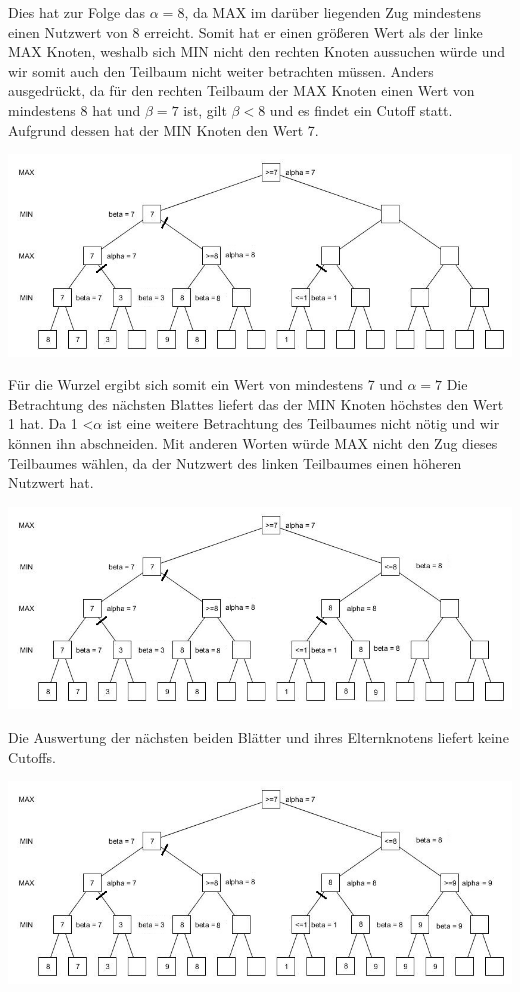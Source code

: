  Dies hat zur Folge das $\alpha =8$, da MAX im darüber liegenden Zug mindestens einen Nutzwert von 8 erreicht. Somit hat er einen größeren Wert als der linke MAX Knoten, weshalb sich MIN nicht den rechten Knoten aussuchen würde und wir somit auch den Teilbaum nicht weiter betrachten müssen. Anders ausgedrückt, da für den rechten Teilbaum der MAX Knoten einen Wert von mindestens 8 hat und  $\beta = 7$ ist, gilt $\beta<8$ und es findet ein Cutoff statt.  Aufgrund dessen hat der MIN Knoten den Wert 7.

 \begin{center}
 	\includegraphics[width = 12 cm]{chapters/minimax/jpg/Alpha-beta7.jpg}
 \end{center}

 Für die Wurzel ergibt sich somit ein Wert von mindestens 7 und $\alpha = 7$
 Die Betrachtung des nächsten Blattes liefert das der MIN Knoten höchstes den Wert 1 hat. Da 1 <$\alpha$ ist eine weitere Betrachtung des Teilbaumes nicht nötig und wir können ihn abschneiden. Mit anderen Worten würde MAX nicht den Zug dieses Teilbaumes wählen, da der Nutzwert des linken Teilbaumes einen höheren Nutzwert hat.

 \begin{center}
 	\includegraphics[width = 12 cm]{chapters/minimax/jpg/Alpha-beta8.jpg}
 \end{center}

 Die Auswertung der nächsten beiden Blätter und ihres Elternknotens liefert keine Cutoffs.

 \begin{center}
 	\includegraphics[width = 12 cm]{chapters/minimax/jpg/Alpha-beta9.jpg}
 \end{center}

